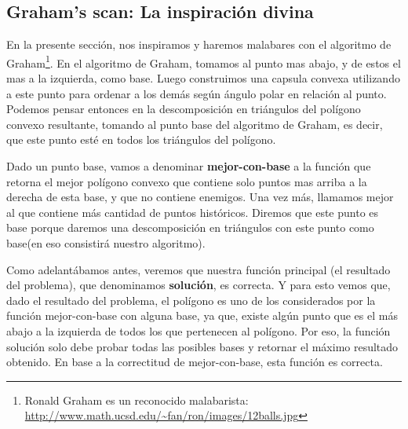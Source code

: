 \subsection{Graham's scan: La inspiración divina}
\par{En la presente sección, nos inspiramos y haremos malabares con el algoritmo de Graham\footnote{Ronald Graham es un reconocido malabarista: \url{http://www.math.ucsd.edu/~fan/ron/images/12balls.jpg}}.
En el algoritmo de Graham, tomamos al punto mas abajo, y de estos el mas a la izquierda, como base. Luego construimos una capsula convexa utilizando a este punto para ordenar a los demás según ángulo polar en relación al punto. Podemos pensar entonces en la descomposición en triángulos del polígono convexo resultante, tomando al punto base del algoritmo de Graham, es decir, que este punto esté en todos los triángulos del polígono.}

\par{Dado un punto base, vamos a denominar \textbf{mejor-con-base} a la función que retorna el mejor polígono convexo que contiene solo puntos mas arriba a la derecha de esta base, y que no contiene enemigos. Una vez más, llamamos mejor al que contiene más cantidad de puntos históricos. Diremos que este punto es base porque daremos una descomposición en triángulos con este punto como base(en eso consistirá nuestro algoritmo).}
\par{Como adelantábamos antes, veremos que nuestra función principal (el resultado del problema), que denominamos \textbf{solución}, es correcta. Y para esto vemos que, dado el resultado del problema, el polígono es uno de los considerados por la función mejor-con-base con alguna base, ya que, existe algún punto que es el más abajo a la izquierda de todos los que pertenecen al polígono. Por eso, la función solución solo debe probar todas las posibles bases y retornar el máximo resultado obtenido. En base a la correctitud de mejor-con-base, esta función es correcta.}

